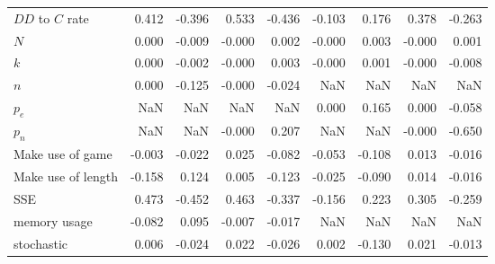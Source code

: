 \begin{tabular}{lrrrrrrrr}
$DD$ to $C$ rate     &            0.412 &        -0.396 &            0.533 &        -0.436 &           -0.103 &         0.176 &            0.378 &        -0.263 \\
$N$                  &            0.000 &        -0.009 &           -0.000 &         0.002 &           -0.000 &         0.003 &           -0.000 &         0.001 \\
$k$                  &            0.000 &        -0.002 &           -0.000 &         0.003 &           -0.000 &         0.001 &           -0.000 &        -0.008 \\
$n$                  &            0.000 &        -0.125 &           -0.000 &        -0.024 &              NaN &           NaN &              NaN &           NaN \\
$p_e$                &              NaN &           NaN &              NaN &           NaN &            0.000 &         0.165 &            0.000 &        -0.058 \\
$p_n$                &              NaN &           NaN &           -0.000 &         0.207 &              NaN &           NaN &           -0.000 &        -0.650 \\
Make use of game     &           -0.003 &        -0.022 &            0.025 &        -0.082 &           -0.053 &        -0.108 &            0.013 &        -0.016 \\
Make use of length   &           -0.158 &         0.124 &            0.005 &        -0.123 &           -0.025 &        -0.090 &            0.014 &        -0.016 \\
SSE                  &            0.473 &        -0.452 &            0.463 &        -0.337 &           -0.156 &         0.223 &            0.305 &        -0.259 \\
memory usage         &           -0.082 &         0.095 &           -0.007 &        -0.017 &              NaN &           NaN &              NaN &           NaN \\
stochastic           &            0.006 &        -0.024 &            0.022 &        -0.026 &            0.002 &        -0.130 &            0.021 &        -0.013 \\
\bottomrule
\end{tabular}
